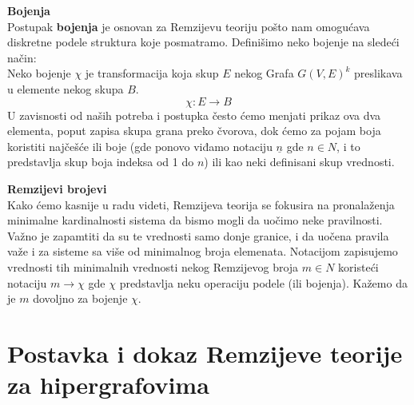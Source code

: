 \documentclass[a4paper]{article}
\begin{document}
\begin{description}
		\pagebreak
		\item \textbf{Bojenja} \\
		Postupak \textbf{bojenja} je osnovan za Remzijevu teoriju pošto nam omogućava diskretne podele struktura koje posmatramo. Definišimo neko bojenje na sledeći način: \\ 
		Neko bojenje $\chi$ je transformacija koja skup $E$ nekog Grafa $G(V,E)^k$ preslikava u elemente nekog skupa $B$.
		\[ 
			\chi : E \rightarrow B
		 \] 
		 U zavisnosti od naših potreba i postupka često ćemo menjati prikaz ova dva elementa, poput zapisa skupa grana preko čvorova, dok ćemo za pojam boja koristiti najčešće ili boje (gde ponovo viđamo notaciju $\underline{n}$ gde $n \in N$, i to predstavlja skup boja indeksa od 1 do $n$) ili kao neki definisani skup vrednosti. %
		\item \textbf{Remzijevi brojevi}\\
		Kako ćemo kasnije u radu videti, Remzijeva teorija se fokusira na pronalaženja minimalne kardinalnosti sistema da bismo mogli da uočimo neke pravilnosti. Važno je zapamtiti da su te vrednosti samo donje granice, i da uočena pravila važe i za sisteme sa više od minimalnog broja elemenata. Notacijom zapisujemo vrednosti tih minimalnih vrednosti nekog Remzijevog broja $m \in N$ koristeći notaciju $m \rightarrow \chi$ gde $\chi$ predstavlja neku operaciju podele (ili bojenja). Kažemo da je $m$ dovoljno za bojenje $\chi$.
	\end{description}
	
	\section{Postavka i dokaz Remzijeve teorije za hipergrafovima}
\end{document}
